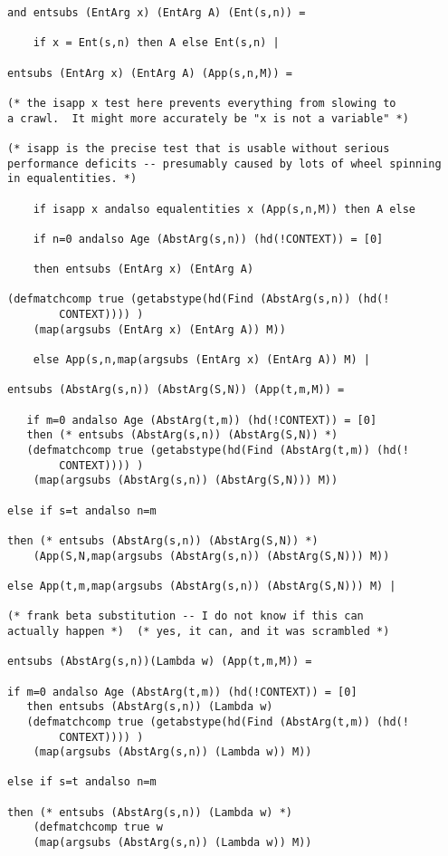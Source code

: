 \documentclass{article}
\begin{document}
\begin{verbatim}
and entsubs (EntArg x) (EntArg A) (Ent(s,n)) =

    if x = Ent(s,n) then A else Ent(s,n) |

entsubs (EntArg x) (EntArg A) (App(s,n,M)) =

(* the isapp x test here prevents everything from slowing to
a crawl.  It might more accurately be "x is not a variable" *)

(* isapp is the precise test that is usable without serious
performance deficits -- presumably caused by lots of wheel spinning
in equalentities. *)

    if isapp x andalso equalentities x (App(s,n,M)) then A else

    if n=0 andalso Age (AbstArg(s,n)) (hd(!CONTEXT)) = [0]

    then entsubs (EntArg x) (EntArg A) 

(defmatchcomp true (getabstype(hd(Find (AbstArg(s,n)) (hd(!
        CONTEXT)))) )
    (map(argsubs (EntArg x) (EntArg A)) M))

    else App(s,n,map(argsubs (EntArg x) (EntArg A)) M) |

entsubs (AbstArg(s,n)) (AbstArg(S,N)) (App(t,m,M)) =

   if m=0 andalso Age (AbstArg(t,m)) (hd(!CONTEXT)) = [0]
   then (* entsubs (AbstArg(s,n)) (AbstArg(S,N)) *)
   (defmatchcomp true (getabstype(hd(Find (AbstArg(t,m)) (hd(!
        CONTEXT)))) )
    (map(argsubs (AbstArg(s,n)) (AbstArg(S,N))) M))

else if s=t andalso n=m 

then (* entsubs (AbstArg(s,n)) (AbstArg(S,N)) *)
    (App(S,N,map(argsubs (AbstArg(s,n)) (AbstArg(S,N))) M))

else App(t,m,map(argsubs (AbstArg(s,n)) (AbstArg(S,N))) M) |

(* frank beta substitution -- I do not know if this can
actually happen *)  (* yes, it can, and it was scrambled *)

entsubs (AbstArg(s,n))(Lambda w) (App(t,m,M)) =

if m=0 andalso Age (AbstArg(t,m)) (hd(!CONTEXT)) = [0]
   then entsubs (AbstArg(s,n)) (Lambda w) 
   (defmatchcomp true (getabstype(hd(Find (AbstArg(t,m)) (hd(!
        CONTEXT)))) )
    (map(argsubs (AbstArg(s,n)) (Lambda w)) M))

else if s=t andalso n=m 

then (* entsubs (AbstArg(s,n)) (Lambda w) *)
    (defmatchcomp true w
    (map(argsubs (AbstArg(s,n)) (Lambda w)) M)) 


\end{verbatim}
\end{document}
